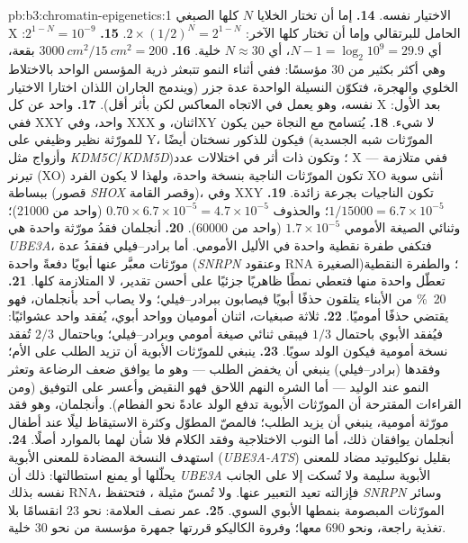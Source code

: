 \begin{solution}{pb:b3:chromatin-epigenetics:1}
الاختيار نفسه.
\textbf{14.} إما أن تختار الخلايا $N$ كلها الصبغي X الحامل للبرتقالي
وإما أن تختار كلها الآخر: $2\times (1/2)^{N} = 2^{1-N}$.
\textbf{15.} $2^{1-N} = 10^{-9}$: أي $N - 1 = \log_{2} 10^{9} = 29.9$،
أي $N \approx 30$ خلية.
\textbf{16.} $\qty{3000}{cm^2}/\qty{15}{cm^2} = 200$ بقعة، وهي أكثر
بكثير من $30$ مؤسسًا: ففي أثناء النمو تتبعثر ذرية المؤسس الواحد
بالاختلاط الخلوي والهجرة، فتكوّن النسيلة الواحدة عدة جزر (ويندمج
الجاران اللذان اختارا الاختيار نفسه، وهو يعمل في الاتجاه المعاكس
لكن بأثر أقل).
\textbf{17.}  واحد عن كل X بعد الأول: ففي XXY واحد، وفي XXX
اثنان، وXY لا شيء.
\textbf{18.} يُتسامح مع النجاة حين يكون للمورّثة نظير وظيفي على Y،
فيكون للذكور نسختان أيضًا (المورّثات شبه الجسدية وأزواج مثل
\emph{KDM5C}/\emph{KDM5D})؛ وتكون ذات أثر في اختلالات عدد X --- ففي
متلازمة تيرنر (XO) تكون المورّثات الناجية بنسخة واحدة، ولهذا لا يكون
الفرد XO أنثى سوية ببساطة (قصور \emph{SHOX} وقصر القامة)، وفي XXY
تكون الناجيات بجرعة زائدة.
\textbf{19.} $1/\num{15000} = 6.7\times 10^{-5}$؛ والحذوف $0.70\times
6.7\times 10^{-5} = 4.7\times 10^{-5}$ (واحد من \num{21000})؛ وثنائي
الصيغة الأمومي $1.7\times 10^{-5}$ (واحد من \num{60000}).
\textbf{20.} أنجلمان فقدُ مورّثة واحدة هي \emph{UBE3A}، فتكفي طفرة
نقطية واحدة في الأليل الأمومي. أما برادر--فيلي ففقدُ عدة مورّثات
معبَّر عنها أبويًا دفعةً واحدة (\emph{SNRPN} وعنقود RNA الصغيرة)؛
والطفرة النقطية تعطّل واحدة منها فتعطي نمطًا ظاهريًا جزئيًا على
أحسن تقدير، لا المتلازمة كلها.
\textbf{21.} \qty{20}{\%} من الأبناء يتلقون حذفًا أبويًا فيصابون
ببرادر--فيلي؛ ولا يصاب أحد بأنجلمان، فهو يقتضي حذفًا أموميًا.
\textbf{22.} ثلاثة صبغيات، اثنان أموميان وواحد أبوي، يُفقد واحد
عشوائيًا: فيُفقد الأبوي باحتمال $1/3$ فيبقى ثنائي صيغة أمومي
وبرادر--فيلي؛ وباحتمال $2/3$ تُفقد نسخة أمومية فيكون الولد سويًا.
\textbf{23.} ينبغي للمورّثات الأبوية أن تزيد الطلب على الأم؛ وفقدها
(برادر--فيلي) ينبغي أن يخفض الطلب --- وهو ما يوافق ضعف الرضاعة
وتعثر النمو عند الوليد --- أما الشره النهم اللاحق فهو النقيض وأعسر
على التوفيق (ومن القراءات المقترحة أن المورّثات الأبوية تدفع الولد
عادةً نحو الفطام). وأنجلمان، وهو فقد مورّثة أمومية، ينبغي أن يزيد
الطلب؛ فالمصّ المطوّل وكثرة الاستيقاظ ليلًا عند أطفال أنجلمان
يوافقان ذلك، أما النوب الاختلاجية وفقد الكلام فلا شأن لهما بالموارد
أصلًا.
\textbf{24.} استهدف النسخة المضادة للمعنى الأبوية
(\emph{UBE3A-ATS}) بقليل نوكليوتيد مضاد للمعنى يحلّلها أو يمنع
استطالتها: ذلك أن \emph{UBE3A} الأبوية سليمة ولا تُسكت إلا على الجانب
نفسه بذلك RNA، فإزالته تعيد التعبير عنها. ولا تُمسّ مثيلة ، فتحتفظ \emph{SNRPN} وسائر المورّثات المبصومة بنمطها
الأبوي السوي.
\textbf{25.} عمر نصف العلامة: نحو $23$ انقسامًا بلا تغذية راجعة،
ونحو $690$ معها؛ وفروة الكاليكو قررتها جمهرة مؤسسة من نحو $30$ خلية.
\end{solution}
